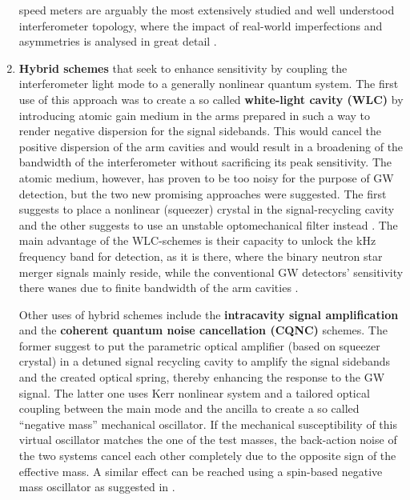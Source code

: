 \begin{enumerate}
speed meters are arguably the most extensively studied and well understood interferometer topology, where the impact of real-world imperfections and asymmetries is analysed in great detail \cite{2015_NJP17.043031_asymSag, 2018_NJP.20.10.103040_QN_cancellation,2017_PhysRevD.95.062001}. 
\item
\textbf{Hybrid schemes} that seek to enhance sensitivity by coupling the interferometer light mode to a generally nonlinear quantum system.  
The first use of this approach was to create a so called \textbf{white-light cavity (WLC)}  \cite{Wicht1997} by introducing atomic gain medium in the arms
prepared in such a way to render negative dispersion for the signal sidebands. This would cancel the positive dispersion of the arm cavities 
and would result in a broadening of the bandwidth of the interferometer without sacrificing its peak sensitivity. The atomic medium,
however, has proven to be too noisy for the purpose of GW detection, but the two new promising approaches were suggested. The first suggests to place a 
nonlinear (squeezer) crystal in the signal-recycling cavity \cite{Korobko2017} and the other suggests to use an unstable optomechanical filter instead \cite{Miao2015a,Peano2015}. 
The main advantage of the WLC-schemes is their capacity to unlock the kHz frequency band for detection, as it is there, where the binary 
neutron star merger signals mainly reside,  while the conventional GW detectors' sensitivity there wanes due to finite bandwidth of the arm cavities \cite{Miao2017c}.

Other uses of hybrid schemes include the \textbf{intracavity signal amplification} \cite{Somiya2014,17a1KoKhSc} and the \textbf{coherent quantum noise cancellation (CQNC)} \cite{2010_PhysRevLett.105.123601_CQNC_Tsang,2014_PhysRevA.89.053836_CQNC_Wimmer} schemes. The former suggest to put the parametric optical amplifier (based on squeezer crystal) 
in a detuned signal recycling cavity to amplify the signal sidebands and the created optical spring, thereby enhancing the response to the GW signal. The latter one uses 
Kerr nonlinear system and a tailored optical coupling between the main mode and the ancilla to create a so called ``negative mass'' mechanical oscillator. If the mechanical susceptibility
 of this virtual oscillator matches the one of the test masses, the back-action noise of the two systems cancel each other completely due to the opposite sign of the effective mass. A similar effect can be reached using a spin-based negative mass oscillator as suggested in \cite{17a1KhPo,Moeller_Nature_547_191_2017}.
\end{enumerate}
